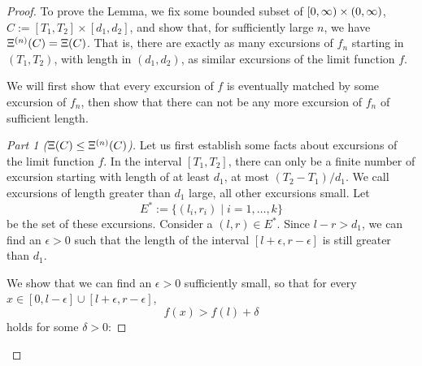 \begin{proof}
To prove the Lemma, 
we fix some bounded subset of
$[0, \infty) \times (0, \infty)$,
$C := [T_1, T_2] \times [d_1, d_2]$,
and show that, for sufficiently large $n$,
we have $\Xi^{(n)}(C) = \Xi(C)$.
That is,
there are exactly as many excursions of $f_n$ starting in
$(T_1, T_2)$, 
with length in $(d_1, d_2)$,
as similar excursions of the limit function $f$.

We will first show that every excursion of $f$ is eventually matched by some excursion of $f_n$,
then show that there can not be any more excursion of $f_n$ of sufficient length.


\begin{proof}[Part 1 ($\Xi(C) \leq \Xi^{(n)}(C)$)] \label{PP: Lemma Det 1} \renewcommand{\qedsymbol}{}
Let us first establish some facts about excursions of the limit function $f$.
In the interval $[T_1, T_2]$,
there can only be a finite number of excursion starting with length of at least $d_1$,
at most $(T_2 - T_1)/d_1$.
We call excursions of length greater than $d_1$ large, all other excursions small.
Let
\begin{equation*}
E^* := \{ (l_i, r_i) \; | \; i=1, \dots, k \}	
\end{equation*}
be the set of these excursions.
Consider a
$(l,r) \in E^*$.
Since $l-r > d_1$,
we can find an $\epsilon > 0$
such that the length of the interval
$[l+\epsilon, r-\epsilon]$
is still greater than $d_1$.

We show that we can find an $\epsilon > 0$ sufficiently small,
so that for every
$x \in [0, l-\epsilon] \cup [l+\epsilon, r-\epsilon]$,
\begin{equation} \label{E: fx > fl + delta}
f(x) > f(l) + \delta
\end{equation}
holds for some $\delta > 0$:


\end{proof}
\end{proof}
